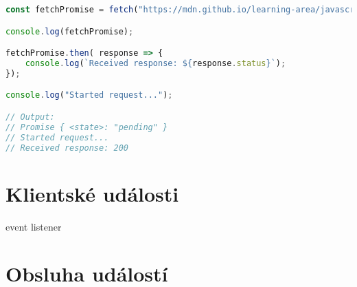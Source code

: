 \noindent\begin{minipage}{\linewidth}
\begin{lstlisting}[language=javascript, caption={Příklad asynchronního programování, volání API.}]
const fetchPromise = fetch("https://mdn.github.io/learning-area/javascript/apis/fetching-data/can-store/products.json");

console.log(fetchPromise);

fetchPromise.then( response => {
    console.log(`Received response: ${response.status}`);
});

console.log("Started request...");

// Output:
// Promise { <state>: "pending" }
// Started request...
// Received response: 200
\end{lstlisting}
\end{minipage}


\section{Klientské události}

\begin{compactitem}
    \item event listener
    \item {}
\end{compactitem}

\section{Obsluha událostí}

\begin{compactitem}
    \item {}
\end{compactitem}
